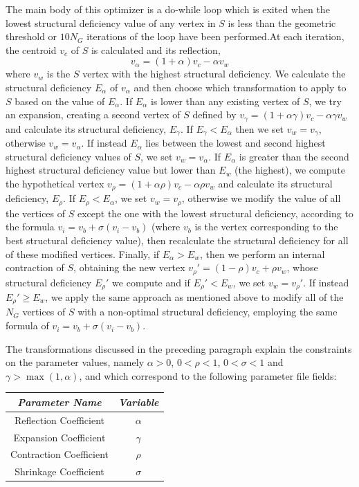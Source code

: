 \documentclass[12pt,letterpaper]{report}
\begin{document}
The main body of this optimizer is a do-while loop which is exited when the lowest structural 
deficiency value of any vertex in $S$ is less than the geometric threshold or $10N_G$ iterations of 
the loop have been performed.At each iteration, the centroid $v_c$ of $S$ is calculated and its 
reflection,
\begin{equation*}
v_\alpha = (1+\alpha) v_c - \alpha v_w 
\end{equation*}
where $v_w$ is the $S$ vertex with the highest structural deficiency. We calculate the structural 
deficiency $E_\alpha$ of $v_\alpha$ and then choose which transformation to apply to $S$ based on the 
value of $E_\alpha$. If $E_\alpha$ is lower than any existing vertex of $S$, we try an expansion, creating 
a second vertex of $S$ defined by $v_\gamma = (1+\alpha\gamma) v_c - \alpha\gamma v_w$ and calculate its 
structural deficiency, $E_\gamma$. If $E_\gamma < E_\alpha$ then we set $v_w = v_\gamma$, otherwise $v_w = 
v_\alpha$. If instead $E_\alpha$ lies between the lowest and second highest structural deficiency values 
of $S$, we set $v_w = v_\alpha$. If $E_\alpha$ is greater than the second highest structural deficiency 
value but lower than $E_w$ (the highest), we compute the hypothetical vertex $v_\rho = (1+\alpha\rho) 
v_c - \alpha\rho v_w$ and calculate its structural deficiency, $E_\rho$. If $E_\rho < E_\alpha$, we set 
$v_w = v_\rho$, otherwise we modify the value of all the vertices of $S$ except the one with the lowest 
structural deficiency, according to the formula $v_i = v_b + \sigma (v_i - v_b)$ (where $v_b$ is the 
vertex corresponding to the best structural deficiency value), then recalculate the structural deficiency 
for all of these modified vertices. Finally, if $E_\alpha > E_w$, then we perform an internal contraction 
of $S$, obtaining the new vertex $v_\rho' = (1-\rho) v_c + \rho v_w$, whose structural deficiency 
$E_\rho'$ we compute and if $E_\rho' < E_w$, we set $v_w = v_\rho'$. If instead $E_\rho' \ge E_w$, we apply 
the same approach as mentioned above to modify all of the $N_G$ vertices of $S$ with a non-optimal 
structural deficiency, employing the same formula of $v_i = v_b + \sigma (v_i - v_b)$. 

The transformations discussed in the preceding paragraph explain the constraints on the parameter 
values, namely $\alpha > 0$, $0 < \rho < 1$, $0 < \sigma < 1$ and $\gamma > \max(1,\alpha)$, and 
which correspond to the following parameter file fields: 
\begin{center}
\begin{tabular}{|c|c|}
\hline
\emph{Parameter Name} & \emph{Variable} \\ \hline
Reflection Coefficient & $\alpha$ \\ \hline
Expansion Coefficient & $\gamma$ \\ \hline
Contraction Coefficient & $\rho$ \\ \hline
Shrinkage Coefficient & $\sigma$ \\ \hline
\end{tabular}
\end{center}    
    
\end{document}
